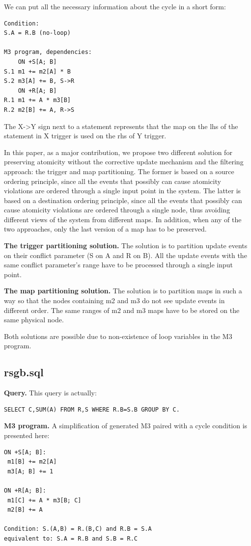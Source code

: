 \documentclass{sig-semester}
\begin{document}
We can put all the necessary information about the cycle in a short form:
\begin{verbatim}
Condition: 
S.A = R.B (no-loop)

M3 program, dependencies:
    ON +S[A; B] 
S.1 m1 += m2[A] * B
S.2 m3[A] += B, S->R
    ON +R[A; B] 
R.1 m1 += A * m3[B]
R.2 m2[B] += A, R->S
\end{verbatim}
The X->Y sign next to a statement represents that the map on the lhs of the statement in X trigger is used on the rhs of Y trigger.

In this paper, as a major contribution, we propose two different solution for preserving atomicity without the corrective update mechanism and the filtering approach: the trigger and map partitioning. The former is based on a source ordering principle, since all the events that possibly can cause atomicity violations are ordered through a single input point in the system. The latter is based on a destination ordering principle, since all the events that possibly can cause atomicity violations are ordered through a single node, thus avoiding different views of the system from different maps. In addition, when any of the two approaches, only the last version of a map has to be preserved.

\textbf{The trigger partitioning solution.} The solution is to partition update events on their conflict parameter (S on A and R on B). All the update events with the same conflict parameter's range have to be processed through a single input point.

\textbf{The map partitioning solution.} The solution is to partition maps in such a way so that the nodes containing m2 and m3 do not see update events in different order. The same ranges of m2 and m3 maps have to be stored on the same physical node.

Both solutions are possible due to non-existence of loop variables in the M3 program.

\subsection{rsgb.sql}
\textbf{Query.} This query is actually:
\begin{verbatim}
SELECT C,SUM(A) FROM R,S WHERE R.B=S.B GROUP BY C.
\end{verbatim}

\newpage
\textbf{M3 program.} A simplification of generated M3 paired with a cycle condition is presented here:
\begin{verbatim}
ON +S[A; B]: 
 m1[B] += m2[A]
 m3[A; B] += 1

ON +R[A; B]:
 m1[C] += A * m3[B; C]
 m2[B] += A

Condition: S.(A,B) = R.(B,C) and R.B = S.A
equivalent to: S.A = R.B and S.B = R.C
\end{verbatim}
\end{document}
